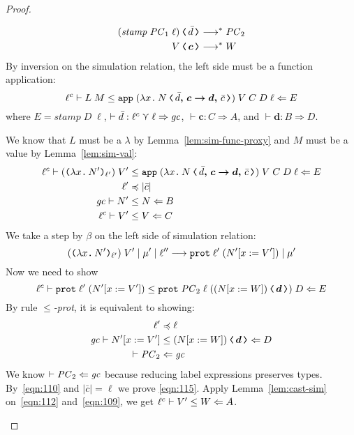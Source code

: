 \begin{proof}
\begin{description}
      \begin{align}
      \cccast{(\mathit{stamp}\;\PC_1\;\ell)}{\bar{d}} &\longrightarrow^{*} \PC_2  \label{eqn:108} \\
      \cccast{V}{\bm{c}} &\longrightarrow^{*} W  \label{eqn:109}
      \end{align}
      By inversion on the simulation relation, the left side must be a function application:
      \[
      \ell^c \vdash L\;M \leq \ccapp{(\cccast{\cclam{x}{N}}{\coerc{\funco{\bar{d}}{\bm{c}}{\bm{d}}}{\bar{c}}})}{V}{C}{D}{\ell}
      \Leftarrow E
      \]
      where $E = \textit{stamp}\;D\;\ell$, $\vdash \bar{d} : \ell^c \curlyvee \ell \Rightarrow \mathit{gc}$,
      $\vdash \bm{c} : C \Rightarrow A$, and $\vdash \bm{d} : B \Rightarrow D$.

      We know that $L$ must be a $\lambda$ by Lemma~\ref{lem:sim-func-proxy} and
      $M$ must be a value by Lemma~\ref{lem:sim-val}:
      \begin{align}
      \ell^c \vdash (\dynlam{x}{N'}{\ell'})\;V' &\leq \ccapp{(\cccast{\cclam{x}{N}}{\coerc{\funco{\bar{d}}{\bm{c}}{\bm{d}}}{\bar{c}}})}{V}{C}{D}{\ell}
      \Leftarrow E \\
      \ell' &\preccurlyeq |\bar{c}| \label{eqn:110} \\
      \gc \vdash N' &\leq N \Leftarrow B \label{eqn:111} \\
      \ell^c \vdash V' &\leq V \Leftarrow C \label{eqn:112}
      \end{align}
      We take a step by $\beta$ on the left side of simulation relation:
      \[
        {(\text{\texttt{{(${\lambda}$}}}{x}\text{\texttt{{.}}}\,{N'}\text{\texttt{{)}}}_{\ell'})\;V'}\mid{\mu'}\mid{\ell''}\longrightarrow{\ensuremath{\text{\texttt{{prot}}}\;{\ell'}\;{(N'[x:=V'])}}}\mid{\mu'}
      \]
      Now we need to show
      \[
      \ell^c \vdash \dynprot{\ell'}{(N'[x:=V'])} \leq \ccprot{\PC_2}{\ell}{(\cccast{(N[x:=W])}{\bm{d}})}{D}
      \Leftarrow E
      \]
      By rule ${\leq}$\textit{-prot}, it is equivalent to showing:
      \begin{align}
      \ell' &\preccurlyeq \ell \label{eqn:115} \\
      \gc \vdash N'[x:=V'] &\leq \cccast{(N[x:=W])}{\bm{d}} \Leftarrow D \label{eqn:116} \\
      \vdash \PC_2 &\Leftarrow \gc
      \end{align}
      We know $\vdash \mathit{PC}_2 \Leftarrow \mathit{gc}$ because reducing label expressions preserves types.
      By~\eqref{eqn:110} and $|\bar{c}| = \ell$ we prove \eqref{eqn:115}.
      Apply Lemma~\ref{lem:cast-sim} on~\eqref{eqn:112} and~\eqref{eqn:109}, we get
      ${\ell^c}\vdash{V'}\leq{W}\Leftarrow{A}$.

\end{description}
\end{proof}
